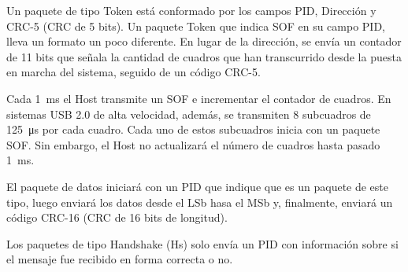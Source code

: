 	Un paquete de tipo Token está conformado por los campos PID, Dirección y CRC-5 (CRC de 5 bits). Un paquete Token que indica SOF en su campo PID, lleva un formato un poco diferente. En lugar de la dirección, se envía un contador de 11 bits que señala la cantidad de cuadros que han transcurrido desde la puesta en marcha del sistema, seguido de un código CRC-5.%
		
	Cada \SI{1}{\milli\second} el Host transmite un SOF e incrementar el contador de cuadros. En sistemas USB 2.0 de alta velocidad, además, se transmiten 8 subcuadros de \SI{125}{\micro\second} por cada cuadro. Cada uno de estos subcuadros inicia con un paquete SOF. Sin embargo, el Host no actualizará el número de cuadros hasta pasado \SI{1}{\milli\second}.%
		
	El paquete de datos iniciará con un PID que indique que es un paquete de este tipo, luego enviará los datos desde el LSb hasa el MSb y, finalmente, enviará un código CRC-16 (CRC de 16 bits de longitud).%
		
	Los paquetes de tipo Handshake (Hs) solo envía un PID con información sobre si el mensaje fue recibido en forma correcta o no.